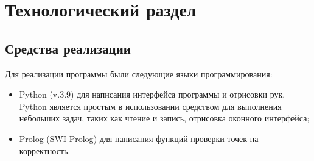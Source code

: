 \chapter{Технологический раздел}


\section{Средства реализации}
\hspace{0.6cm}Для реализации программы были следующие языки программирования:
\begin{itemize}
	\item Python (v.3.9\cite{web:python}) для написания интерфейса программы и отрисовки рук. Python является простым в использовании средством для выполнения небольших задач, таких как чтение и запись, отрисовка оконного интерфейса;
	\item Prolog (SWI-Prolog\cite{web:prolog}) для написания функций проверки точек на корректность.
\end{itemize}
 
